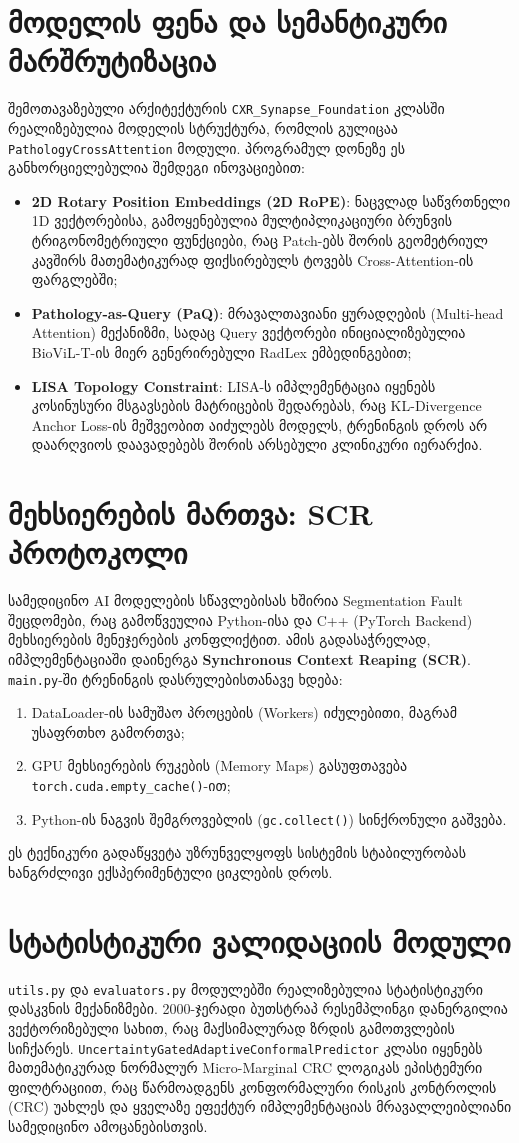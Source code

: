 \documentclass[12pt,a4paper,oneside]{report}
\begin{document}
\section{მოდელის ფენა და სემანტიკური მარშრუტიზაცია}
შემოთავაზებული არქიტექტურის \texttt{CXR\_Synapse\_Foundation} კლასში რეალიზებულია მოდელის სტრუქტურა, რომლის გულიცაა \texttt{PathologyCrossAttention} მოდული. პროგრამულ დონეზე ეს განხორციელებულია შემდეგი ინოვაციებით:
\begin{itemize}
    \item \textbf{2D Rotary Position Embeddings (2D RoPE)}: ნაცვლად საწვრთნელი 1D ვექტორებისა, გამოყენებულია მულტიპლიკაციური ბრუნვის ტრიგონომეტრიული ფუნქციები, რაც Patch-ებს შორის გეომეტრიულ კავშირს მათემატიკურად ფიქსირებულს ტოვებს Cross-Attention-ის ფარგლებში;
    \item \textbf{Pathology-as-Query (PaQ)}: მრავალთავიანი ყურადღების (Multi-head Attention) მექანიზმი, სადაც Query ვექტორები ინიციალიზებულია BioViL-T-ის მიერ გენერირებული RadLex ემბედინგებით;
    \item \textbf{LISA Topology Constraint}: LISA-ს იმპლემენტაცია იყენებს კოსინუსური მსგავსების მატრიცების შედარებას, რაც KL-Divergence Anchor Loss-ის მეშვეობით აიძულებს მოდელს, ტრენინგის დროს არ დაარღვიოს დაავადებებს შორის არსებული კლინიკური იერარქია.
\end{itemize}

\section{მეხსიერების მართვა: SCR პროტოკოლი}
სამედიცინო AI მოდელების სწავლებისას ხშირია Segmentation Fault შეცდომები, რაც გამოწვეულია Python-ისა და C++ (PyTorch Backend) მეხსიერების მენეჯერების კონფლიქტით. ამის გადასაჭრელად, იმპლემენტაციაში დაინერგა \textbf{Synchronous Context Reaping (SCR)}.
\texttt{main.py}-ში ტრენინგის დასრულებისთანავე ხდება:
\begin{enumerate}
    \item DataLoader-ის სამუშაო პროცების (Workers) იძულებითი, მაგრამ უსაფრთხო გამორთვა;
    \item GPU მეხსიერების რუკების (Memory Maps) გასუფთავება \texttt{torch.cuda.empty\_cache()}-ით;
    \item Python-ის ნაგვის შემგროვებლის (\texttt{gc.collect()}) სინქრონული გაშვება.
\end{enumerate}
ეს ტექნიკური გადაწყვეტა უზრუნველყოფს სისტემის სტაბილურობას ხანგრძლივი ექსპერიმენტული ციკლების დროს.

\section{სტატისტიკური ვალიდაციის მოდული}
\texttt{utils.py} და \texttt{evaluators.py} მოდულებში რეალიზებულია სტატისტიკური დასკვნის მექანიზმები. 2000-ჯერადი ბუთსტრაპ რესემპლინგი დანერგილია ვექტორიზებული სახით, რაც მაქსიმალურად ზრდის გამოთვლების სიჩქარეს. \texttt{UncertaintyGatedAdaptiveConformalPredictor} კლასი იყენებს მათემატიკურად ნორმალურ Micro-Marginal CRC ლოგიკას ეპისტემური ფილტრაციით, რაც წარმოადგენს კონფორმალური რისკის კონტროლის (CRC) უახლეს და ყველაზე ეფექტურ იმპლემენტაციას მრავალლეიბლიანი სამედიცინო ამოცანებისთვის.
\end{document}
